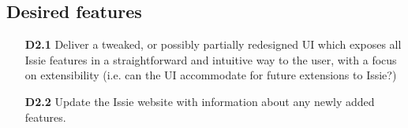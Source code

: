\subsection*{Desired features}
\begin{itemize}
    \item[\textbf{D2.1}] Deliver a tweaked, or possibly partially redesigned UI which exposes all Issie features in a straightforward and intuitive way to the user, with a focus on extensibility (i.e. can the UI accommodate for future extensions to Issie?)
    \medskip
    \item[\textbf{D2.2}] Update the Issie website with information about any newly added features.
\end{itemize}


